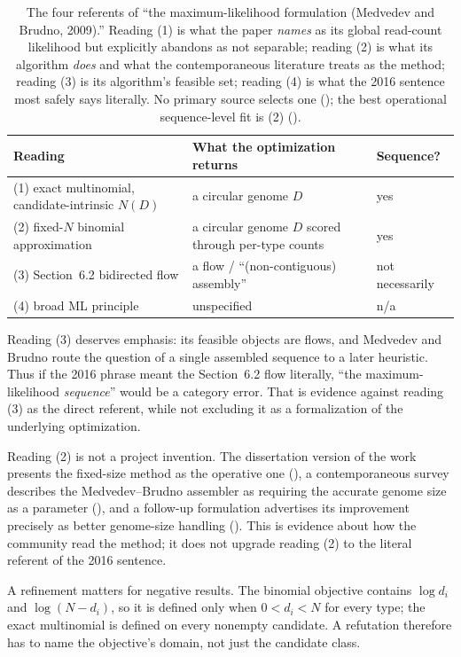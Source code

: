 \begin{table}[h]
\centering
\small
\begin{tabular}{@{}p{}p{}p{}@{}}
\toprule
Reading & What the optimization returns & Sequence? \\
\midrule
(1) exact multinomial, candidate-intrinsic $N(D)$
  & a circular genome $D$
  & yes \\
(2) fixed-$N$ binomial approximation
  & a circular genome $D$ scored through per-type counts
  & yes \\
(3) Section~6.2 bidirected flow
  & a flow / ``(non-contiguous) assembly''
  & not necessarily \\
(4) broad ML principle
  & unspecified
  & n/a \\
\bottomrule
\end{tabular}
\caption{The four referents of ``the maximum-likelihood formulation
(Medvedev and Brudno, 2009).'' Reading (1) is what the paper \emph{names} as its
global read-count likelihood but explicitly abandons as not separable;
reading (2) is what its algorithm \emph{does} and what the contemporaneous
literature treats as the method; reading (3) is its algorithm's feasible set;
reading (4) is what the 2016 sentence most safely says literally. No primary
source selects one (\srcfact); the best operational sequence-level fit is (2)
(\srcinf).}
\label{tab:referents}
\end{table}

Reading (3) deserves emphasis: its feasible objects are flows, and Medvedev and
Brudno route the question of a single assembled sequence to a later heuristic.
Thus if the 2016 phrase meant the Section~6.2 flow literally, ``the
maximum-likelihood \emph{sequence}'' would be a category error. That is evidence
against reading (3) as the direct referent, while not excluding it as a
formalization of the underlying optimization.

Reading (2) is not a project invention. The dissertation version of the work
presents the fixed-size method as the operative one (\cite{medvedev2010}), a
contemporaneous survey describes the Medvedev--Brudno assembler as requiring the
accurate genome size as a parameter (\cite{howison2013}), and a follow-up
formulation advertises its improvement precisely as better genome-size handling
(\cite{varma2011}). This is evidence about how the community read the method; it
does not upgrade reading (2) to the literal referent of the 2016 sentence.

A refinement matters for negative results. The binomial objective contains
$\log d_i$ and $\log(N-d_i)$, so it is defined only when $0<d_i<N$ for every
type; the exact multinomial is defined on every nonempty candidate. A refutation
therefore has to name the objective's domain, not just the candidate class.

